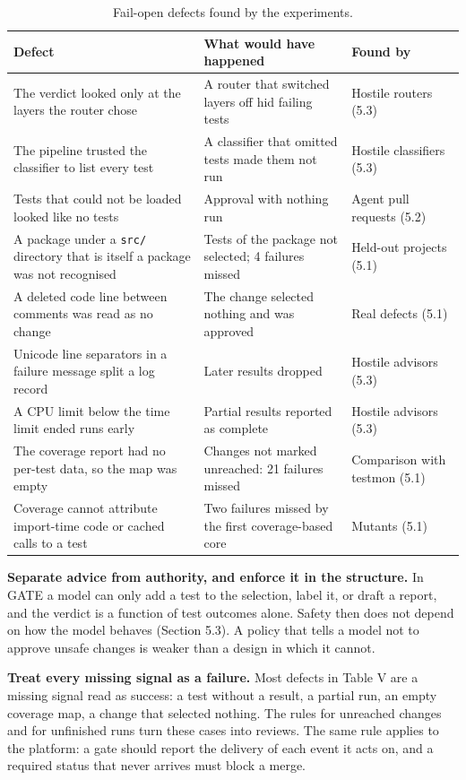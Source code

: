 \documentclass[conference]{IEEEtran}
\begin{document}
\begin{table}[t]
\caption{Fail-open defects found by the experiments.}
\centering\scriptsize
\begin{tabularx}{\textwidth}{>{\raggedright\arraybackslash}X>{\raggedright\arraybackslash}X>{\raggedright\arraybackslash}X}
\toprule
\textbf{Defect} & \textbf{What would have happened} & \textbf{Found by} \\
\midrule
The verdict looked only at the layers the router chose & A router that switched layers off hid failing tests & Hostile routers (5.3) \\
The pipeline trusted the classifier to list every test & A classifier that omitted tests made them not run & Hostile classifiers (5.3) \\
Tests that could not be loaded looked like no tests & Approval with nothing run & Agent pull requests (5.2) \\
A package under a \texttt{src/} directory that is itself a package was not recognised & Tests of the package not selected; 4 failures missed & Held-out projects (5.1) \\
A deleted code line between comments was read as no change & The change selected nothing and was approved & Real defects (5.1) \\
Unicode line separators in a failure message split a log record & Later results dropped & Hostile advisors (5.3) \\
A CPU limit below the time limit ended runs early & Partial results reported as complete & Hostile advisors (5.3) \\
The coverage report had no per-test data, so the map was empty & Changes not marked unreached: 21 failures missed & Comparison with testmon (5.1) \\
Coverage cannot attribute import-time code or cached calls to a test & Two failures missed by the first coverage-based core & Mutants (5.1) \\
\bottomrule
\end{tabularx}
\end{table}

\textbf{Separate advice from authority, and enforce it in the structure.} In GATE a model can only add a test to the selection, label it, or draft a report, and the verdict is a function of test outcomes alone. Safety then does not depend on how the model behaves (Section 5.3). A policy that tells a model not to approve unsafe changes is weaker than a design in which it cannot.

\textbf{Treat every missing signal as a failure.} Most defects in Table V are a missing signal read as success: a test without a result, a partial run, an empty coverage map, a change that selected nothing. The rules for unreached changes and for unfinished runs turn these cases into reviews. The same rule applies to the platform: a gate should report the delivery of each event it acts on, and a required status that never arrives must block a merge.
\end{document}
